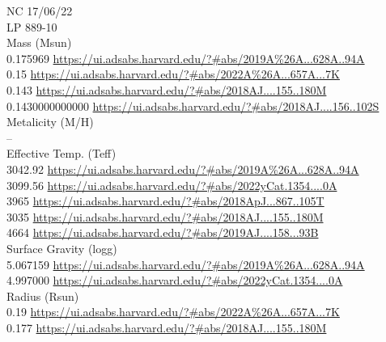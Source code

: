NC 17/06/22\\
LP 889-10\\
Mass (Msun)\\
0.175969 \url{https://ui.adsabs.harvard.edu/?#abs/2019A%26A...628A..94A}\\
0.15 \url{https://ui.adsabs.harvard.edu/?#abs/2022A%26A...657A...7K}\\
0.143 \url{https://ui.adsabs.harvard.edu/?#abs/2018AJ....155..180M}\\
0.1430000000000 \url{https://ui.adsabs.harvard.edu/?#abs/2018AJ....156..102S}\\
Metalicity (M/H)\\
--\\
Effective Temp. (Teff)\\
3042.92 \url{https://ui.adsabs.harvard.edu/?#abs/2019A%26A...628A..94A}\\
3099.56	\url{https://ui.adsabs.harvard.edu/?#abs/2022yCat.1354....0A}\\
3965 \url{https://ui.adsabs.harvard.edu/?#abs/2018ApJ...867..105T}\\
3035 \url{https://ui.adsabs.harvard.edu/?#abs/2018AJ....155..180M}\\
4664 \url{https://ui.adsabs.harvard.edu/?#abs/2019AJ....158...93B}\\
Surface Gravity (logg)\\
5.067159 \url{https://ui.adsabs.harvard.edu/?#abs/2019A%26A...628A..94A}\\
4.997000 \url{https://ui.adsabs.harvard.edu/?#abs/2022yCat.1354....0A}\\
Radius (Rsun)\\
0.19 \url{https://ui.adsabs.harvard.edu/?#abs/2022A%26A...657A...7K}\\
0.177 \url{https://ui.adsabs.harvard.edu/?#abs/2018AJ....155..180M}\\

